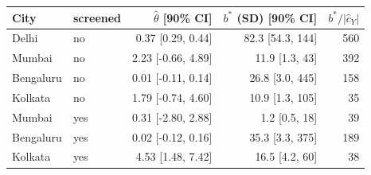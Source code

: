 \begin{tabular}{llrrr}
\toprule
City & screened & $\hat\theta$ [90\% CI] & $b^*$ (SD) [90\% CI] & $b^*/|\hat c_Y|$ \\
\midrule
Delhi & no & 0.37 [0.29, 0.44] & 82.3 [54.3, 144] & 560 \\
Mumbai & no & 2.23 [-0.66, 4.89] & 11.9 [1.3, 43] & 392 \\
Bengaluru & no & 0.01 [-0.11, 0.14] & 26.8 [3.0, 445] & 158 \\
Kolkata & no & 1.79 [-0.74, 4.60] & 10.9 [1.3, 105] & 35 \\
Mumbai & yes & 0.31 [-2.80, 2.88] & 1.2 [0.5, 18] & 39 \\
Bengaluru & yes & 0.02 [-0.12, 0.16] & 35.3 [3.3, 375] & 189 \\
Kolkata & yes & 4.53 [1.48, 7.42] & 16.5 [4.2, 60] & 38 \\
\bottomrule
\end{tabular}